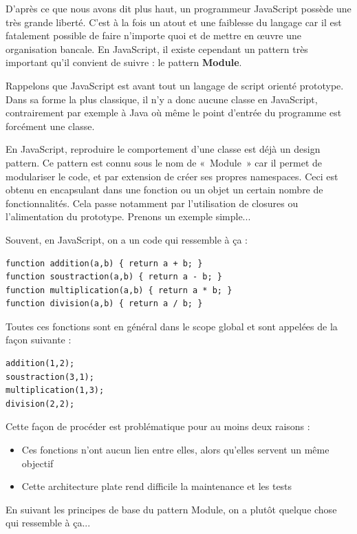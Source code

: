 \documentclass[a4paper,12pt]{article}
\begin{document}
D'après ce que nous avons dit plus haut, un programmeur JavaScript possède une très grande liberté. C'est à la fois un atout et une faiblesse du langage car il est fatalement possible de faire n'importe quoi et de mettre en œuvre une organisation bancale. En JavaScript, il existe cependant un pattern très important qu'il convient de suivre : le pattern \textbf{Module}.

Rappelons que JavaScript est avant tout un langage de script orienté prototype. Dans sa forme la plus classique, il n'y a donc aucune classe en JavaScript, contrairement par exemple à Java où même le point d'entrée du programme est forcément une classe.

\newpage

En JavaScript, reproduire le comportement d'une classe est déjà un design pattern. Ce pattern est connu sous le nom de «~Module~» car il permet de modulariser le code, et par extension de créer ses propres namespaces. Ceci est obtenu en encapsulant dans une fonction ou un objet un certain nombre de fonctionnalités. Cela passe notamment par l'utilisation de closures ou l'alimentation du prototype. Prenons un exemple simple...

Souvent, en JavaScript, on a un code qui ressemble à ça :

\begin{lstlisting}
function addition(a,b) { return a + b; }
function soustraction(a,b) { return a - b; }
function multiplication(a,b) { return a * b; }
function division(a,b) { return a / b; }
\end{lstlisting}

Toutes ces fonctions sont en général dans le scope global et sont appelées de la façon suivante :

\begin{lstlisting}
addition(1,2);
soustraction(3,1);
multiplication(1,3);
division(2,2);
\end{lstlisting}

Cette façon de procéder est problématique pour au moins deux raisons :

\begin{itemize}
 \item{Ces fonctions n'ont aucun lien entre elles, alors qu'elles servent un même objectif}
 \item{Cette architecture plate rend difficile la maintenance et les tests}
\end{itemize}

En suivant les principes de base du pattern Module, on a plutôt quelque chose qui ressemble à ça...
\end{document}
